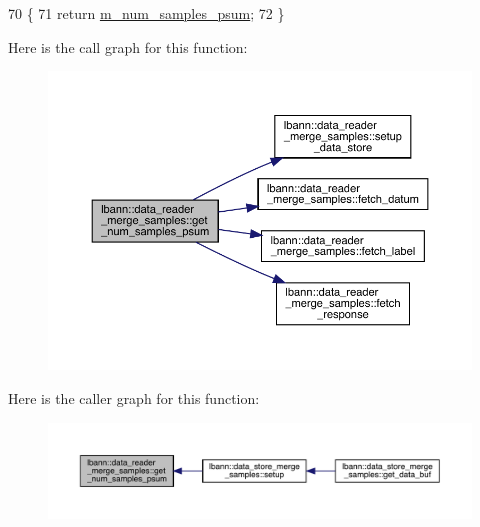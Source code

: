 \begin{DoxyCode}
70                                                 \{
71     \textcolor{keywordflow}{return} \hyperlink{classlbann_1_1data__reader__merge__samples_afd297d61c11bb6b0d03ce64836bd1300}{m\_num\_samples\_psum};
72   \}
\end{DoxyCode}
Here is the call graph for this function\+:\nopagebreak
\begin{figure}[H]
\begin{center}
\leavevmode
\includegraphics[width=350pt]{classlbann_1_1data__reader__merge__samples_a43dc3d7861f0231d96a9baa77916dff5_cgraph}
\end{center}
\end{figure}
Here is the caller graph for this function\+:\nopagebreak
\begin{figure}[H]
\begin{center}
\leavevmode
\includegraphics[width=350pt]{classlbann_1_1data__reader__merge__samples_a43dc3d7861f0231d96a9baa77916dff5_icgraph}
\end{center}
\end{figure}
\mbox{\label{classlbann_1_1data__reader__merge__samples_a5d24385daebfd31343e6afc11b0439d1}} 
